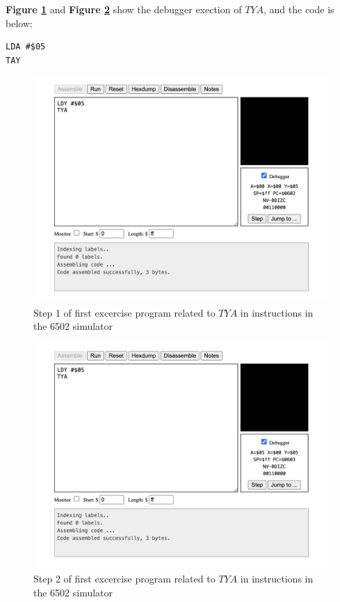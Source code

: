 \documentclass[a4paper]{article}
\begin{document}
\textbf{Figure \ref{fig:21-ex1-3-step1}} and \textbf{Figure \ref{fig:22-ex1-3-step2}} show the debugger exection of $TYA$, and the code is below:


\begin{lstlisting}[style=6502asm]
LDA #$05
TAY
\end{lstlisting}

\begin{figure}[H]
    \centering
    \includegraphics[width=1.0\textwidth]{res/images/q2/21-ex1-3-step1.png}
    \caption{Step 1 of first excercise program related to $TYA$ in instructions in the 6502 simulator}
    \label{fig:21-ex1-3-step1}
\end{figure}

\begin{figure}[H]
    \centering
    \includegraphics[width=1.0\textwidth]{res/images/q2/22-ex1-3-step2.png}
    \caption{Step 2 of first excercise program related to $TYA$ in instructions in the 6502 simulator}
    \label{fig:22-ex1-3-step2}
\end{figure}
\end{document}

